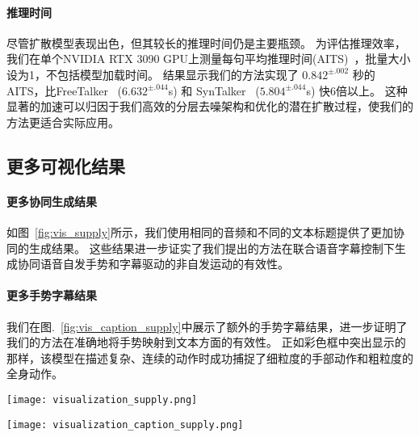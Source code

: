 \paragraph{推理时间}
尽管扩散模型表现出色，但其较长的推理时间仍是主要瓶颈。
为评估推理效率，我们在单个NVIDIA RTX 3090 GPU上测量每句平均推理时间(AITS)~\cite{chen2023executing}，批量大小设为1，不包括模型加载时间。
结果显示我们的方法实现了 $0.842^{\pm .002}$ 秒的AITS，比FreeTalker~\cite{yang2024freetalker} ($6.632^{\pm .044}$s) 和 SynTalker~\cite{chen2024syntalker} ($5.804^{\pm .044}$s) 快6倍以上。
这种显著的加速可以归因于我们高效的分层去噪架构和优化的潜在扩散过程，使我们的方法更适合实际应用。

\subsection{更多可视化结果}
\paragraph{更多协同生成结果}
如图~\ref{fig:vis_supply}所示，我们使用相同的音频和不同的文本标题提供了更加协同的生成结果。
这些结果进一步证实了我们提出的方法在联合语音字幕控制下生成协同语音自发手势和字幕驱动的非自发运动的有效性。

\paragraph{更多手势字幕结果}
我们在图.~\ref{fig:vis_caption_supply}中展示了额外的手势字幕结果，进一步证明了我们的方法在准确地将手势映射到文本方面的有效性。
正如彩色框中突出显示的那样，该模型在描述复杂、连续的动作时成功捕捉了细粒度的手部动作和粗粒度的全身动作。

\begin{figure*}[t]
  \centering
  \texttt{[image: visualization\_supply.png]}
  \caption{协同手势生成的更多视觉结果。}
  \label{fig:vis_supply}
\end{figure*}

\begin{figure*}[t]
  \centering
  \texttt{[image: visualization\_caption\_supply.png]}
  \caption{更多手势字幕结果。彩色框突出显示了手势和文本字幕之间的精确映射。}
  \label{fig:vis_caption_supply}
\end{figure*}


